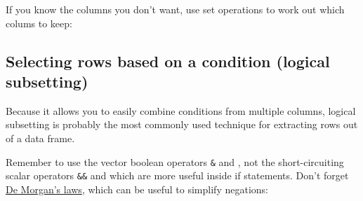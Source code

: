 If you know the columns you don't want, use set operations to work out
which colums to keep:

\begin{Shaded}
\begin{Highlighting}[]
\NormalTok{df[}\NormalTok{(}\NormalTok{)]}
\end{Highlighting}
\end{Shaded}

\subsection{Selecting rows based on a condition (logical subsetting)}

Because it allows you to easily combine conditions from multiple
columns, logical subsetting is probably the most commonly used technique
for extracting rows out of a data frame.

\begin{Shaded}
\begin{Highlighting}[]
\NormalTok{mtcars[mtcars$gear ==}\StringTok{ }\NormalTok{, ]}
\NormalTok{mtcars[mtcars$gear ==}\StringTok{ } \NormalTok{&}\StringTok{ }\StringTok{ }\NormalTok{, ]}
\end{Highlighting}
\end{Shaded}

Remember to use the vector boolean operators \texttt{\&} and
\texttt{\textbar{}}, not the short-circuiting scalar operators
\texttt{\&\&} and \texttt{\textbar{}\textbar{}} which are more useful
inside if statements. Don't forget
\href{http://en.wikipedia.org/wiki/De_Morgan's_laws}{De Morgan's laws},
which can be useful to simplify negations:

